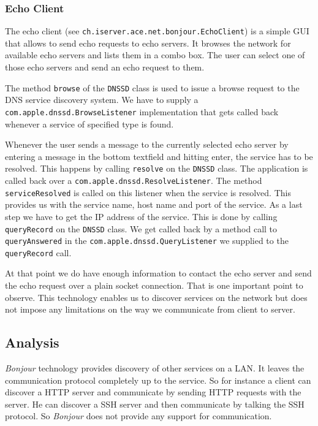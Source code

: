 \subsubsection{Echo Client}
The echo client (see \texttt{ch.iserver.ace.net.bonjour.EchoClient}) is a simple GUI that allows to send echo requests to echo servers. It browses the network for available echo servers and lists them in a combo box. The user can select one of those echo servers and send an echo request to them.

The method \texttt{browse} of the \texttt{DNSSD} class is used to issue a browse request to the DNS service discovery system. We have to supply a \texttt{com.apple.dnssd.BrowseListener} implementation that gets called back whenever a service of specified type is found.

Whenever the user sends a message to the currently selected echo server by entering a message in the bottom textfield and hitting enter, the service has to be resolved. This happens by calling \texttt{resolve} on the \texttt{DNSSD} class. The application is called back over a \texttt{com.apple.dnssd.ResolveListener}. The method \texttt{serviceResolved} is called on this listener when the service is resolved. This provides us with the service name, host name and port of the service. As a last step we have to get the IP address of the service. This is done by calling \texttt{queryRecord} on the \texttt{DNSSD} class. We get called back by a method call to \texttt{queryAnswered} in the \texttt{com.apple.dnssd.QueryListener} we supplied to the \texttt{queryRecord} call.

At that point we do have enough information to contact the echo server and send the echo request over a plain socket connection. That is one important point to observe. This technology enables us to discover services on the network but does not impose any limitations on the way we communicate from client to server.


\subsection{Analysis}
\emph{Bonjour} technology provides discovery of other services on a LAN. It leaves the communication protocol completely up to the service. So for instance a client can discover a HTTP server and communicate by sending HTTP requests with the server. He can discover a SSH server and then communicate by talking the SSH protocol. So \emph{Bonjour} does not provide any support for communication.

